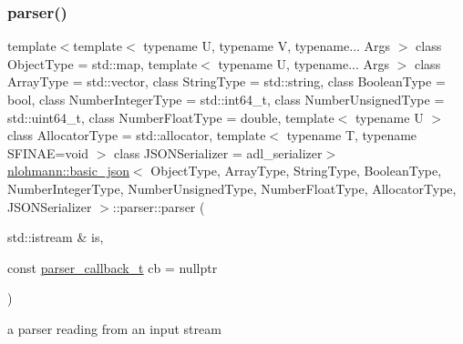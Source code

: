 \subsubsection{\texorpdfstring{parser()}{parser()}\hspace{0.1cm}{\footnotesize\ttfamily [2/3]}}
{\footnotesize\ttfamily template$<$template$<$ typename U, typename V, typename... Args $>$ class Object\+Type = std\+::map, template$<$ typename U, typename... Args $>$ class Array\+Type = std\+::vector, class String\+Type  = std\+::string, class Boolean\+Type  = bool, class Number\+Integer\+Type  = std\+::int64\+\_\+t, class Number\+Unsigned\+Type  = std\+::uint64\+\_\+t, class Number\+Float\+Type  = double, template$<$ typename U $>$ class Allocator\+Type = std\+::allocator, template$<$ typename T, typename S\+F\+I\+N\+A\+E=void $>$ class J\+S\+O\+N\+Serializer = adl\+\_\+serializer$>$ \\
\hyperlink{classnlohmann_1_1basic__json}{nlohmann\+::basic\+\_\+json}$<$ Object\+Type, Array\+Type, String\+Type, Boolean\+Type, Number\+Integer\+Type, Number\+Unsigned\+Type, Number\+Float\+Type, Allocator\+Type, J\+S\+O\+N\+Serializer $>$\+::parser\+::parser (\begin{DoxyParamCaption}\item[{std\+::istream \&}]{is,  }\item[{const \hyperlink{classnlohmann_1_1basic__json_aecae491e175f8767c550ae3c59e180e3}{parser\+\_\+callback\+\_\+t}}]{cb = {\ttfamily nullptr} }\end{DoxyParamCaption})\hspace{0.3cm}{\ttfamily [inline]}}



a parser reading from an input stream 

\mbox{\label{classnlohmann_1_1basic__json_1_1parser_a25e0dba43264cb2e57beba2d5757f9f0}} 
